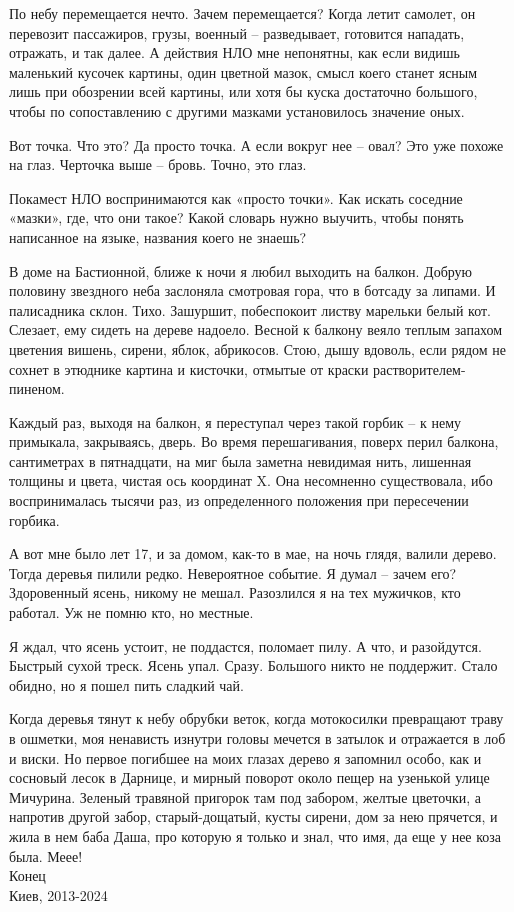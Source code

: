 По небу перемещается нечто. Зачем перемещается? Когда летит самолет, он перевозит пассажиров, грузы, военный – разведывает, готовится нападать, отражать, и так далее. А действия НЛО мне непонятны, как если видишь маленький кусочек картины, один цветной мазок, смысл коего станет ясным лишь при обозрении всей картины, или хотя бы куска достаточно большого, чтобы по сопоставлению с другими мазками установилось значение оных.

Вот точка. Что это? Да просто точка. А если вокруг нее – овал? Это уже похоже на глаз. Черточка выше – бровь. Точно, это глаз.

Покамест НЛО воспринимаются как «просто точки». Как искать соседние «мазки», где, что они такое? Какой словарь нужно выучить, чтобы понять написанное на языке, названия коего не знаешь?

В доме на Бастионной, ближе к ночи я любил выходить на балкон. Добрую половину звездного неба заслоняла смотровая гора, что в ботсаду за липами. И палисадника склон. Тихо. Зашуршит, побеспокоит листву марельки белый кот. Слезает, ему сидеть на дереве надоело. Весной к балкону веяло теплым запахом цветения вишень, сирени, яблок, абрикосов. Стою, дышу вдоволь, если рядом не сохнет в этюднике картина и кисточки, отмытые от краски растворителем-пиненом.

Каждый раз, выходя на балкон, я переступал через такой горбик – к нему примыкала, закрываясь, дверь. Во время перешагивания, поверх перил балкона, сантиметрах в пятнадцати, на миг была заметна невидимая нить, лишенная толщины и цвета, чистая ось координат X. Она несомненно существовала, ибо воспринималась тысячи раз, из определенного положения при пересечении горбика.

А вот мне было лет 17, и за домом, как-то в мае, на ночь глядя, валили дерево. Тогда деревья пилили редко. Невероятное событие. Я думал – зачем его? Здоровенный ясень, никому не мешал. Разозлился я на тех мужичков, кто работал. Уж не помню кто, но местные.

Я ждал, что ясень устоит, не поддастся, поломает пилу. А что, и разойдутся. Быстрый сухой треск. Ясень упал. Сразу. Большого никто не поддержит. Стало обидно, но я пошел пить сладкий чай. 

Когда деревья тянут к небу обрубки веток, когда мотокосилки превращают траву в ошметки, моя ненависть изнутри головы мечется в затылок и отражается в лоб и виски. Но первое погибшее на моих глазах дерево я запомнил особо, как и сосновый лесок в Дарнице, и мирный поворот около пещер на узенькой улице Мичурина. Зеленый травяной пригорок там под забором, желтые цветочки, а напротив другой забор, старый-дощатый, кусты сирени, дом за нею прячется, и жила в нем баба Даша, про которую я только и знал, что имя, да еще у нее коза была. Меее!\\

Конец\\

Киев, 2013-2024\\
